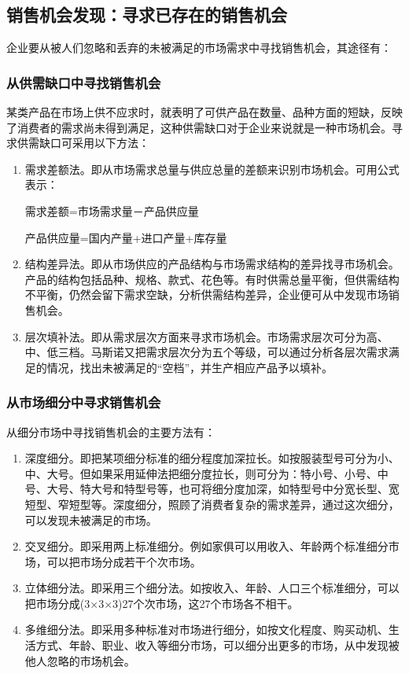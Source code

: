 \subsection {销售机会发现：寻求已存在的销售机会}

    企业要从被人们忽略和丢弃的未被满足的市场需求中寻找销售机会，其途径有：

    \subsubsection {从供需缺口中寻找销售机会}

    某类产品在市场上供不应求时，就表明了可供产品在数量、品种方面的短缺，反映了消费者的需求尚未得到满足，这种供需缺口对于企业来说就是一种市场机会。寻求供需缺口可采用以下方法：

    \begin{enumerate}
        \item 需求差额法。即从市场需求总量与供应总量的差额来识别市场机会。可用公式表示：

        需求差额=市场需求量－产品供应量

        产品供应量=国内产量+进口产量+库存量

        \item 结构差异法。即从市场供应的产品结构与市场需求结构的差异找寻市场机会。产品的结构包括品种、规格、款式、花色等。有时供需总量平衡，但供需结构不平衡，仍然会留下需求空缺，分析供需结构差异，企业便可从中发现市场销售机会。

        \item 层次填补法。即从需求层次方面来寻求市场机会。市场需求层次可分为高、中、低三档。马斯诺又把需求层次分为五个等级，可以通过分析各层次需求满足的情况，找出未被满足的“空档”，并生产相应产品予以填补。
    \end{enumerate}

    \subsubsection {从市场细分中寻求销售机会}

    从细分市场中寻找销售机会的主要方法有：
    \begin{enumerate}
        \item 深度细分。即把某项细分标准的细分程度加深拉长。如按服装型号可分为小、中、大号。但如果采用延伸法把细分度拉长，则可分为：特小号、小号、中号、大号、特大号和特型号等，也可将细分度加深，如特型号中分宽长型、宽短型、窄短型等。深度细分，照顾了消费者复杂的需求差异，通过这次细分，可以发现未被满足的市场。

        \item 交叉细分。即采用两上标准细分。例如家俱可以用收入、年龄两个标准细分市场，可以把市场分成若干个次市场。

        \item 立体细分法。即采用三个细分法。如按收入、年龄、人口三个标准细分，可以把市场分成(3×3×3)27个次市场，这27个市场各不相干。

        \item 多维细分法。即采用多种标准对市场进行细分，如按文化程度、购买动机、生活方式、年龄、职业、收入等细分市场，可以细分出更多的市场，从中发现被他人忽略的市场机会。
    \end{enumerate}

